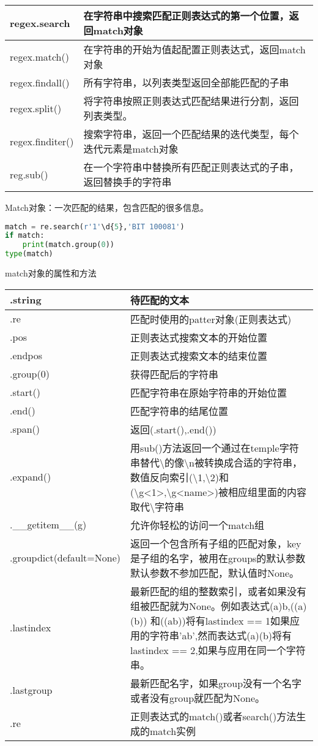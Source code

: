 \documentclass{book}
\begin{document}
\begin{center}
\begin{tabular}{|l|l|}
\hline
regex.search&在字符串中搜索匹配正则表达式的第一个位置，返回match对象\\
\hline
regex.match()&在字符串的开始为值起配置正则表达式，返回match对象\\
\hline
regex.findall()&所有字符串，以列表类型返回全部能匹配的子串\\
\hline
regex.split()&将字符串按照正则表达式匹配结果进行分割，返回列表类型。\\
\hline
regex.finditer()&搜索字符串，返回一个匹配结果的迭代类型，每个迭代元素是match对象\\
\hline
reg.sub()&在一个字符串中替换所有匹配正则表达式的子串，返回替换手的字符串\\
\hline
\end{tabular}
\end{center}
Match对象：一次匹配的结果，包含匹配的很多信息。
\begin{lstlisting}[language=Python]
match = re.search(r'1'\d{5},'BIT 100081')
if match:
    print(match.group(0))
type(match)
\end{lstlisting}
match对象的属性和方法
\begin{center}
\begin{tabular}{|p{4.2cm}|p{10cm}|}
\hline
.string&待匹配的文本\\
\hline
.re&匹配时使用的patter对象(正则表达式)\\
\hline
.pos&正则表达式搜索文本的开始位置\\
\hline
.endpos&正则表达式搜索文本的结束位置\\
\hline
.group(0)&获得匹配后的字符串\\
\hline
.start()&匹配字符串在原始字符串的开始位置\\
\hline
.end()&匹配字符串的结尾位置\\
\hline
.span()&返回(.start(),.end())\\
\hline
.expand()&用sub()方法返回一个通过在temple字符串替代\textbackslash 的像\textbackslash n被转换成合适的字符串，数值反向索引(\textbackslash 1,\textbackslash 2)和(\textbackslash g<1>,\textbackslash g<name>)被相应组里面的内容取代\textbackslash 字符串\\
\hline
.\_\_getitem\_\_(g)&允许你轻松的访问一个match组\\
\hline
.groupdict(default=None)&返回一个包含所有子组的匹配对象，key是子组的名字，被用在groups的默认参数
默认参数不参加匹配，默认值时None。\\
\hline
.lastindex&最新匹配的组的整数索引，或者如果没有组被匹配就为None。例如表达式(a)b,((a)(b))
和((ab))将有lastindex == 1如果应用的字符串'ab',然而表达式(a)(b)将有lastindex == 2,如果与应用在同一个字符串。\\
\hline
.lastgroup&最新匹配名字，如果group没有一个名字或者没有group就匹配为None。\\
\hline
.re&正则表达式的match()或者search()方法生成的match实例\\
\hline
\end{tabular}
\end{center}
\end{document}
